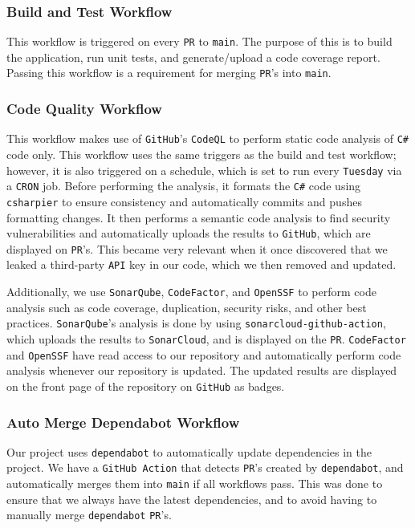 \subsubsection{Build and Test Workflow}
This workflow is triggered on every \texttt{PR} to \texttt{main}.
The purpose of this is to build the application, run unit tests, 
and generate/upload a code coverage report.
Passing this workflow is a requirement for merging \texttt{PR}'s into \texttt{main}.

\subsubsection{Code Quality Workflow}
This workflow makes use of \texttt{GitHub}'s \texttt{CodeQL} to perform static code analysis 
of \texttt{C\#} code only.
This workflow uses the same triggers as the build and test workflow; however, 
it is also triggered on a schedule, which is set to run every \texttt{Tuesday} via a \texttt{CRON} job.
Before performing the analysis, it formats the \texttt{C\#} code using \texttt{csharpier} to 
ensure consistency and automatically commits and pushes formatting changes.
It then performs a semantic code analysis to find security vulnerabilities and 
automatically uploads the results to \texttt{GitHub}, which are displayed on \texttt{PR}'s.
This became very relevant when it once discovered that we leaked a third-party 
\texttt{API} key in our code, which we then removed and updated.

Additionally, we use \texttt{SonarQube}, \texttt{CodeFactor}, and \texttt{OpenSSF} to perform code analysis 
such as code coverage, duplication, security risks, and other best practices.
\texttt{SonarQube}'s analysis is done by using \texttt{sonarcloud-github-action}, which 
uploads the results to \texttt{SonarCloud}, and is displayed on the \texttt{PR}.
\texttt{CodeFactor} and \texttt{OpenSSF} have read access to our repository and automatically 
perform code analysis whenever our repository is updated.
The updated results are displayed on the front page of the repository on \texttt{GitHub} as badges.

\subsubsection{Auto Merge Dependabot Workflow}
Our project uses \texttt{dependabot} to automatically update dependencies in the project.
We have a \texttt{GitHub Action} that detects \texttt{PR}'s created by \texttt{dependabot}, and automatically merges 
them into \texttt{main} if all workflows pass.
This was done to ensure that we always have the latest dependencies,
and to avoid having to manually merge \texttt{dependabot} \texttt{PR}'s.

